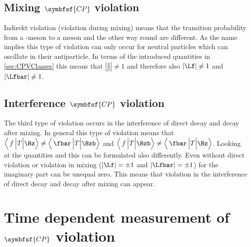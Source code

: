 \subsection[head={Mixing \CP violation},tocentry={Mixing \CP violation}]{Mixing $\symbfsf{C{}P}$ violation}
\label{sec:MixingCPV}

Indirekt \CP violation (\CP violation during mixing) means that the transition probability from a \Bz-meson to a \Bzb meson
and the other way round are different. As the name implies this type of \CP violation can only occur for neutral particles
which can oscillate in their antiparticle. In terms of the introduced quantities in \cref{sec:CPVClasses} this means that
$\left|\frac{q}{p}\right|\neq1$ and therefore also $\left|\Lf\right|\neq1$ and $\left|\Lfbar\right|\neq1$.

\subsection[head={Interference \CP violation},tocentry={Interference \CP violation}]{Interference $\symbfsf{C{}P}$ violation}
\label{sec:InterferenceCPV}

The third type of \CP violation occurs in the interference of direct decay and decay after mixing. In general this type of \CP
violation means that $\left<\,f\,\Big|T\Big|\Bz\right>\neq\left<\,\fbar\,\Big|T\Big|\Bzb\right>$ and
$\left<\,f\,\Big|T\Big|\Bzb\right>\neq\left<\,\fbar\,\Big|T\Big|\Bz\right>$. Looking at the quantities \Lf and \Lfbar this can
be formulated also differently. Even without direct \CP violation or \CP violation in mixing ($\left|\Lf\right|=\pm1$ and
$\left|\Lfbar\right|=\pm1$) for the imaginary part can be unequal zero. This means that \CP violation in the interference of
direct decay and decay after mixing can appear.

\section[head={Time dependent measurement of \CP violation},tocentry={Time dependent measurement of \CP violation}]
{Time dependent measurement of $\symbfsf{C{}P}$ violation}
\label{sec:TimeDependentCPV}

